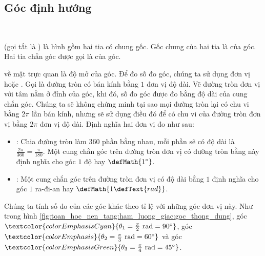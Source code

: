 \subsection{Góc định hướng}

\ %

 (gọi tắt là ) là hình gồm hai tia có chung gốc. Gốc chung của hai tia là  của góc. Hai tia chắn góc được gọi là  của góc.

 về mặt trực quan là độ mở của góc. Để đo số đo góc, chúng ta sử dụng đơn vị  hoặc . Gọi  là đường tròn có bán kính bằng $1$ đơn vị độ dài. Vẽ đường tròn đơn vị với tâm nằm ở đỉnh của góc, khi đó, số đo góc được đo bằng độ dài của cung chắn góc. Chúng ta sẽ không chứng minh tại sao mọi đường tròn lại có chu vi bằng $2\pi$ lần bán kính, nhưng sẽ sử dụng điều đó để có chu vi của đường tròn đơn vị bằng $2\pi$ đơn vị độ dài. Định nghĩa hai đơn vị đo như sau:
\begin{itemize}
   \item {}: Chia đường tròn làm $360$ phần bằng nhau, mỗi phần sẽ có độ dài là $\frac{2\pi}{360} = \frac{\pi}{180}$. Một cung chắn góc trên đường tròn đơn vị có đường tròn bằng này định nghĩa cho góc $1$ độ hay $\defMath{1^\circ}$.
   \item {}: Một cung chắn góc trên đường tròn đơn vị có độ dài bằng $1$ định nghĩa cho góc $1$ ra-đi-an hay $\defMath{1\defText{ rad}}$.
\end{itemize}

Chúng ta tính số đo của các góc khác theo tỉ lệ với những góc đơn vị này. Như trong hình \ref{fig:toan_hoc_nen_tang:ham_luong_giac:goc_thong_dung}, góc $\textcolor{colorEmphasisCyan}{\theta_1 = \frac{\pi}{2} \text{ rad} = 90^\circ}$, góc $\textcolor{colorEmphasis}{\theta_2 = \frac{\pi}{3} \text{ rad} = 60^\circ}$ và góc $\textcolor{colorEmphasisGreen}{\theta_3 = \frac{\pi}{4} \text{ rad} = 45^\circ}$.


